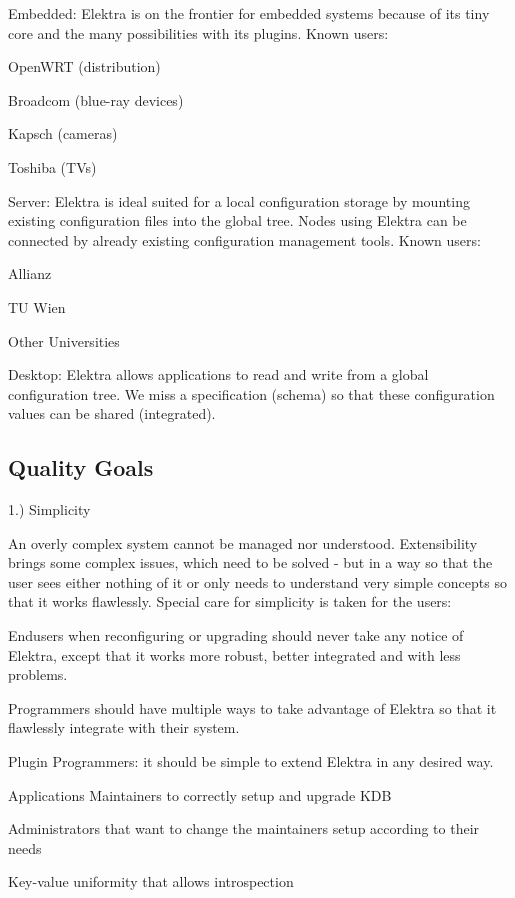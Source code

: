 \begin{DoxyItemize}
\item Embedded\+: Elektra is on the frontier for embedded systems because of its tiny core and the many possibilities with its plugins. Known users\+:
\begin{DoxyItemize}
\item Open\+W\+RT (distribution)
\item Broadcom (blue-\/ray devices)
\item Kapsch (cameras)
\item Toshiba (T\+Vs)
\end{DoxyItemize}
\item Server\+: Elektra is ideal suited for a local configuration storage by mounting existing configuration files into the global tree. Nodes using Elektra can be connected by already existing configuration management tools. Known users\+:
\begin{DoxyItemize}
\item Allianz
\item TU Wien
\item Other Universities
\end{DoxyItemize}
\item Desktop\+: Elektra allows applications to read and write from a global configuration tree. We miss a specification (schema) so that these configuration values can be shared (integrated).
\end{DoxyItemize}

\subsection*{Quality Goals}

1.) Simplicity

An overly complex system cannot be managed nor understood. Extensibility brings some complex issues, which need to be solved -\/ but in a way so that the user sees either nothing of it or only needs to understand very simple concepts so that it works flawlessly. Special care for simplicity is taken for the users\+:


\begin{DoxyItemize}
\item Endusers when reconfiguring or upgrading should never take any notice of Elektra, except that it works more robust, better integrated and with less problems.
\item Programmers should have multiple ways to take advantage of Elektra so that it flawlessly integrate with their system.
\item Plugin Programmers\+: it should be simple to extend Elektra in any desired way.
\item Application\textquotesingle{}s Maintainers to correctly setup and upgrade K\+DB
\item Administrators that want to change the maintainers\textquotesingle{} setup according to their needs
\item Key-\/value uniformity that allows introspection
\end{DoxyItemize}

